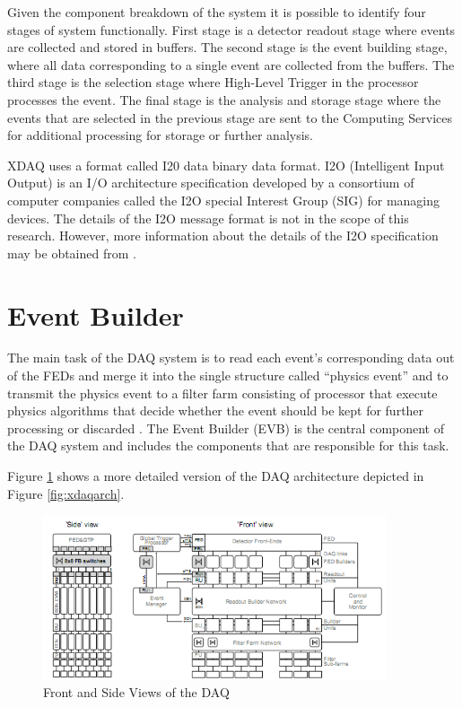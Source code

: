 Given the component breakdown of the system it is possible to identify four stages of system functionally. First stage is a detector readout stage where events are collected and stored in buffers. The second stage is the event building stage, where all data corresponding to a single event are collected from the buffers. The third stage is the selection stage where High-Level Trigger in the processor processes the event. The final stage is the analysis and storage stage where the events that are selected in the previous stage are sent to the Computing Services for additional processing for storage or further analysis. 

XDAQ uses a format called I20 data binary data format. I2O (Intelligent Input Output) is an I/O architecture specification developed by a consortium of computer companies called the I2O special Interest Group (SIG) for managing devices. The details of the I2O message format is not in the scope of this research. However, more information about the details of the I2O specification may be obtained from \cite{I2O}.


\section{Event Builder}
The main task of the DAQ system is to read each event's corresponding data out of the FEDs and merge it into the single structure called ``physics event'' and to transmit the physics event to a filter farm consisting of processor that execute physics algorithms that decide whether the event should be kept for further processing or discarded \cite{CMSTDR}. The Event Builder (EVB) is the central component of the DAQ system and includes the components that are responsible for this task.

Figure \ref{fig:builder} shows a more detailed version of the DAQ architecture depicted in Figure \ref{fig:xdaqarch}.

\begin{figure}
	\centering
		\includegraphics[width=0.90\textwidth]{figures/builder.png}
	\caption{Front and Side Views of the DAQ}
	\label{fig:builder}
\end{figure}


